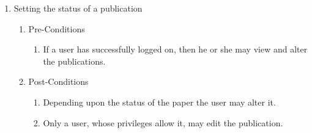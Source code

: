 \documentclass{article} %
\begin{document}
	\begin{enumerate}
		\item  Setting the status of a publication
		
		\begin{enumerate}
			\item  Pre-Conditions
			
			\begin{enumerate}
				\item  If a user has successfully logged on, then he or she may view and alter the publications.
			\end{enumerate}
			
			\item  Post-Conditions
			
			\begin{enumerate}
				\item  Depending upon the status of the paper the user may alter it.
				
				\item  Only a user, whose privileges allow it, may edit the publication. 
			\end{enumerate}
		\end{enumerate}
	\end{enumerate}
	
	\noindent  
	
\end{document}
